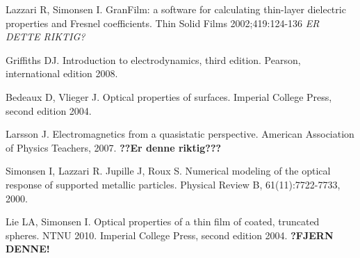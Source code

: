 \begin{thebibliography}{9}

      Lazzari R, Simonsen I. 
      GranFilm: a software for calculating thin-layer 
      dielectric properties and Fresnel coefficients.
      Thin Solid Films 
      2002;419:124-136
      \textit{ER DETTE RIKTIG?}

      Griffiths DJ.
      Introduction to electrodynamics, third edition.
      Pearson, international edition 2008.
      
      Bedeaux D, Vlieger J. 
      Optical properties of surfaces. 
      Imperial College Press, second edition 2004.

      Larsson J.
      Electromagnetics from a quasistatic perspective.
      American Association of Physics Teachers, 2007.
      \textbf{??Er denne riktig???}

      Simonsen I, Lazzari R. Jupille J, Roux S.
      Numerical modeling of the optical response of supported metallic particles.
      Physical Review B, 61(11):7722-7733, 2000.


      Lie LA, Simonsen I.
      Optical properties of a thin film of coated, truncated spheres.
      NTNU 2010.
      Imperial College Press, second edition 2004.
      \textbf{?FJERN DENNE!}
\end{thebibliography}
